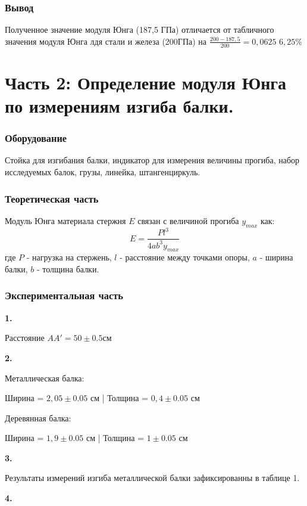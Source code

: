 \documentclass{article}
\begin{document}
\subsubsection*{Вывод}
Полученное значение модуля Юнга (187,5 ГПа) отличается от табличного значения модуля Юнга лдя стали и железа (200ГПа) на $\frac{200-187,5}{200} = 0,0625$ $6,25\%$

\newpage
\section*{Часть 2: Определение модуля Юнга по измерениям изгиба балки.}

\subsubsection*{Оборудование}
Стойка для изгибания балки, индикатор для измерения величины прогиба, набор исследуемых балок, грузы, линейка, штангенциркуль.


\subsubsection*{Теоретическая часть}
Модуль Юнга материала стержня $E$ связан с величиной прогиба $y_{max}$ как: 
\begin{equation}\label{нср}
E=\frac{Pl^3}{4ab^3y_{max}}
\end{equation}
 где $P$ - нагрузка на стержень, $l$ - расстояние между точками опоры, $a$ - ширина балки, $b$ - толщина балки.


\subsubsection*{Экспериментальная часть}

\noindent
\textbf{1.}

\noindent
Расстояние $AA' = 50 \pm 0.5$см

\noindent
\textbf{2.}

\noindent
Металлическая балка: 

Ширина = $2,05 \pm0.05$ см  |  Толщина = $0,4 \pm0.05$ см

\noindent
Деревянная балка: 

Ширина = $1,9 \pm0.05$ см  |  Толщина = $1 \pm0.05$ см

\noindent
\textbf{3.}

\noindent
Результаты измерений изгиба металлической балки зафиксированны в таблице 1.

\noindent
\textbf{4.}
\end{document}

